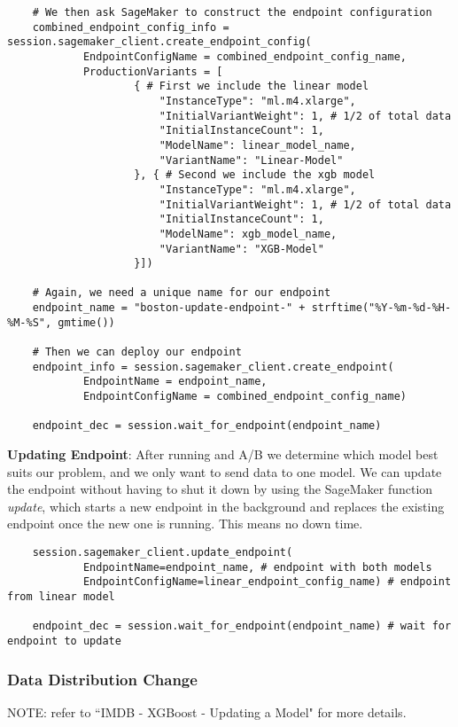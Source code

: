 \documentclass[11pt, a4paper]{article}
\begin{document}
\begin{spacing}{1.1}
\begin{lstlisting}
	# We then ask SageMaker to construct the endpoint configuration
	combined_endpoint_config_info = session.sagemaker_client.create_endpoint_config(
			EndpointConfigName = combined_endpoint_config_name,
			ProductionVariants = [
					{ # First we include the linear model
						"InstanceType": "ml.m4.xlarge",
						"InitialVariantWeight": 1, # 1/2 of total data
						"InitialInstanceCount": 1,
						"ModelName": linear_model_name,
						"VariantName": "Linear-Model"
					}, { # Second we include the xgb model
						"InstanceType": "ml.m4.xlarge",
						"InitialVariantWeight": 1, # 1/2 of total data
						"InitialInstanceCount": 1,
						"ModelName": xgb_model_name,
						"VariantName": "XGB-Model"
					}])
	
	# Again, we need a unique name for our endpoint
	endpoint_name = "boston-update-endpoint-" + strftime("%Y-%m-%d-%H-%M-%S", gmtime())
	
	# Then we can deploy our endpoint
	endpoint_info = session.sagemaker_client.create_endpoint(
			EndpointName = endpoint_name,
			EndpointConfigName = combined_endpoint_config_name)
	
	endpoint_dec = session.wait_for_endpoint(endpoint_name)
	\end{lstlisting} \vspace*{2mm}
	\textbf{Updating Endpoint}: After running and A/B we determine which model best suits our problem, and we only want to send data to one model. We can update the endpoint without having to shut it down by using the SageMaker function \textit{update}, which starts a new endpoint in the background and replaces the existing endpoint once the new one is running. This means no down time.
	\begin{lstlisting}
	session.sagemaker_client.update_endpoint(
			EndpointName=endpoint_name, # endpoint with both models
			EndpointConfigName=linear_endpoint_config_name) # endpoint from linear model
	
	endpoint_dec = session.wait_for_endpoint(endpoint_name) # wait for endpoint to update
	\end{lstlisting} \newpage

	\subsubsection{Data Distribution Change}
	\begin{center}
	\color{darkgray} NOTE: refer to ``IMDB - XGBoost - Updating a Model" for more details. \color{black}
	\end{center} \vspace*{1mm}
	
	
	
	
	
	
	
	
	
	
	
	
	
	
	
	
	
	
	
	
\end{spacing}
\end{document}
